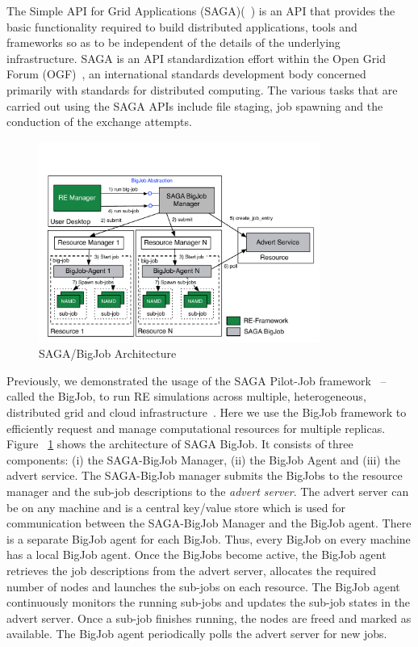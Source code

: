\documentclass{rspublic}
\begin{document}
The Simple API for Grid Applications (SAGA)(~\citep{saga_gfd90}) is an
API that provides the basic functionality required to build
distributed applications, tools and frameworks so as to be independent
of the details of the underlying infrastructure. SAGA is an API
standardization effort within the Open Grid Forum
(OGF)~\citep{ogf_web}, an international standards development body
concerned primarily with standards for distributed computing. The
various tasks that are carried out using the SAGA APIs include file
staging, job spawning and the conduction of the exchange attempts.


\begin{figure}[t]
      \centering
          \includegraphics[width=0.82\textwidth]{../figures/Bigjob_arch.pdf}
          \caption{\footnotesize SAGA/BigJob Architecture
              }
      \label{fig:bigjob}
\end{figure}

Previously, we demonstrated the usage of the SAGA Pilot-Job
framework~\citep{saga_bigjob_condor_cloud} -- called the BigJob, to
run RE simulations across multiple, heterogeneous, distributed grid
and cloud infrastructure~\citep{Luckow:2008fp}. Here we use the BigJob
framework to efficiently request and manage computational resources
for multiple replicas.  Figure ~\ref{fig:bigjob} shows the
architecture of SAGA BigJob.  It consists of three components: (i) the
SAGA-BigJob Manager, (ii) the BigJob Agent and (iii) the advert
service. The SAGA-BigJob manager submits the BigJobs to the resource
manager and the sub-job descriptions to the \emph{advert server}. The
advert server can be on any machine and is a central key/value store
which is used for communication between the SAGA-BigJob Manager and
the BigJob agent. There is a separate BigJob agent for each
BigJob. Thus, every BigJob on every machine has a local BigJob
agent. Once the BigJobs become active, the BigJob agent retrieves the
job descriptions from the advert server, allocates the required number
of nodes and launches the sub-jobs on each resource. The BigJob agent
continuously monitors the running sub-jobs and updates the sub-job
states in the advert server. Once a sub-job finishes running, the
nodes are freed and marked as available. The BigJob agent periodically
polls the advert server for new jobs.
\end{document}
